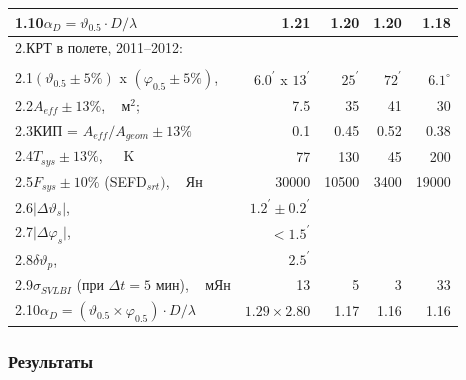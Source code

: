 \begin{table}
\begin{SingleSpace}
\begin{tabular}{l|r|r|r|r}
1.10\quad  $\alpha_D = \vartheta_{0.5} \cdot D / \lambda$\,\,\,                     & 1.21   & 1.20
& 1.20 & 1.18\\
\hline
2.\quad  КРТ в полете, 2011--2012: & & & &\\
                       & & & &\\
2.1\quad  $(\vartheta_{0.5} \pm 5 \%)$ x $(\varphi_{0.5} \pm 5 \%)$,\,
& $6.0^\prime$ x $13^\prime$ & $25^\prime$    & $72^\prime$   & $6.1^\circ$ \\
2.2\quad  $A_{eff} \pm 13\%$, \,\,\, м$^2$;                            & 7.5       & 35    & 41   &
30\\
2.3\quad  КИП = $A_{eff}/A_{geom} \pm 13\%$                            & 0.1       & 0.45  & 0.52 &
0.38\\
2.4\quad  $T_{sys} \pm 13\%$, \,\,\,\,\, K                             & 77        & 130   & 45   &
200\\
2.5\quad  $F_{sys} \pm 10\%$\,\,(SEFD$_{srt})$, \,\,\, Ян              & 30000 & 10500 & 3400 &
19000\\
2.6\quad  $\vert \Delta \vartheta_s \vert$, \,\,\,\, &$1.2^\prime \pm 0.2^\prime$            & & &
\\
2.7\quad  $\vert \Delta \varphi_s \vert$, \,\,\,\,\, &$< 1.5^\prime$            & & & \\
2.8\quad  $\delta \vartheta_p$, \,\,\,\,\,           &$2.5^\prime$              & & & \\
2.9\quad  $\sigma_{SVLBI}$ (при $\Delta t = 5$ мин), \,\,\, мЯн        & 13        & 5     & 3    &
33\\
2.10\quad  $\alpha_D = (\vartheta_{0.5}\times \varphi_{0.5}) \cdot D / \lambda$ &$1.29 \times 2.80$
&1.17 &1.16 &1.16\\
        \bottomrule
        \end{tabular}
    \end{SingleSpace}
\end{table}


\subsubsection{Результаты}


